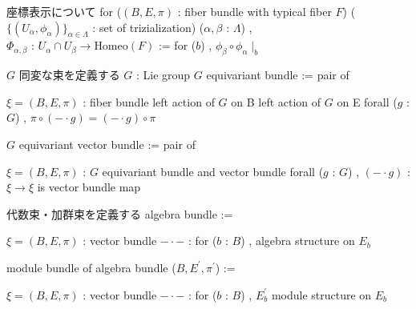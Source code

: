\begin{Definition}
\itemnote 座標表示について
\itemdefi
  for (\((B , E , \pi)\) : fiber bundle with typical fiber \(F\)) (\(\{(U_\alpha , \phi_\alpha)\}_{\alpha \in \Lambda}\) : set of trizialization) (\(\alpha , \beta\) : \(\Lambda\)) ,\\
  \(\Phi_{\alpha , \beta}\) : \(U_\alpha \cap U_\beta \to \text{Homeo}(F)\) := for (\(b\)) , \(\phi_\beta \circ \phi_\alpha \mid_b\)
\end{Definition}

\begin{Definition}
\itemnote \(G\) 同変な束を定義する
\itemwhen \(G\) : Lie group
\itemdefi
  \(G\) equivariant bundle := pair of
  \begin{itemize}
    \itemenum \(\xi = (B , E , \pi)\) : fiber bundle
    \itemenum left action of \(G\) on B
    \itemenum left action of \(G\) on E
    \itemwith forall (\(g\) : \(G\)) , \(\pi \circ (- \cdot g) = (- \cdot g) \circ \pi\)
  \end{itemize}
\itemdefi
  \(G\) equivariant vector bundle := pair of
  \begin{itemize}
    \itemenum \(\xi = (B , E , \pi)\) : \(G\) equivariant bundle and vector bundle
    \itemwith
      forall (\(g\) : \(G\)) , \((- \cdot g)\) : \(\xi \to \xi\) is vector bundle map
  \end{itemize}
\end{Definition}

\begin{Definition}
\itemnote 代数束・加群束を定義する
\itemdefi 
  algebra bundle :=
  \begin{itemize}
    \itemenum \(\xi = (B , E , \pi)\) : vector bundle
    \itemenum \(- \cdot -\) :
      for (\(b\) : \(B\)) , algebra structure on \(E_b\)
    \itemwith {}
  \end{itemize}
  module bundle of algebra bundle (\(B , E^{\prime} , \pi^{\prime}\)) :=
  \begin{itemize}
    \itemenum \(\xi = (B , E , \pi)\) : vector bundle
    \itemenum \(- \cdot -\) :
      for (\(b\) : \(B\)) , \(E^{\prime}_b\) module structure on \(E_b\) 
    \itemwith {}
  \end{itemize}
\end{Definition}